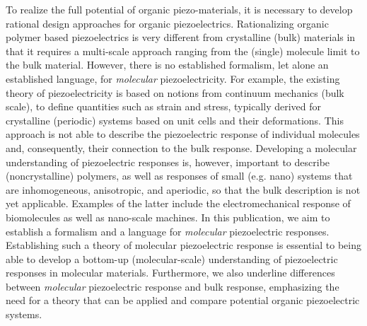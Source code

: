 To realize the full potential of organic piezo-materials, it is necessary to develop
rational design approaches for organic piezoelectrics. 
Rationalizing organic polymer based piezoelectrics is very different from crystalline (bulk) materials in that it requires 
a multi-scale approach ranging from the (single) molecule limit to the bulk material. 
However, there is no established formalism, let alone an established language, for {\em molecular} piezoelectricity. 
For example, the existing theory of piezoelectricity is based on notions from continuum mechanics (bulk scale), to define quantities such as strain and stress,
typically derived for crystalline (periodic) systems based on unit cells and their deformations. 
This approach is not able to describe the piezoelectric response of individual molecules and, consequently, their
connection to the bulk response. 
Developing a molecular understanding of piezoelectric responses is, however, important
to describe (noncrystalline) polymers, as well as responses of small (e.g. nano) systems that are inhomogeneous,
anisotropic, and aperiodic, so that the bulk description is not yet applicable. 
Examples of the latter include the electromechanical response of biomolecules as well as nano-scale
machines.  
In this publication, we aim to establish a formalism and a language for {\em molecular} piezoelectric responses.
Establishing such a theory of molecular piezoelectric response is essential to being able to develop a bottom-up
(molecular-scale) understanding of piezoelectric responses in molecular materials. 
Furthermore, we also underline differences between {\em molecular} piezoelectric response and bulk response, 
emphasizing the need for a theory that can be applied and compare potential organic piezoelectric systems.




